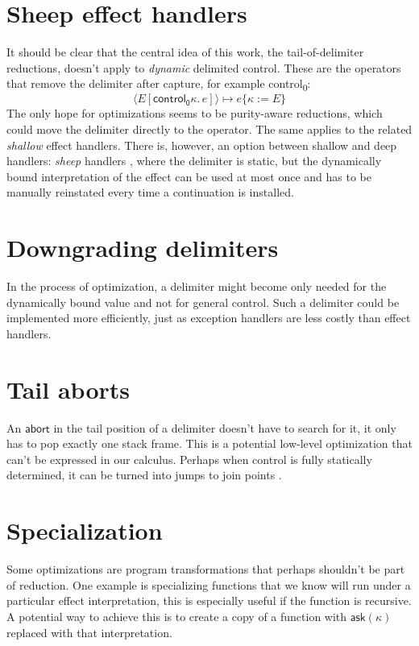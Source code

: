 \documentclass[a4paper, 11pt,titlepage, openright, twoside]{report}
\newcommand{\abort}{\textsf{abort}}
\newcommand{\Ask}{\textsf{ask}}
\newcommand{\subst}[2]{\{#1{:=}#2\}}
\newcommand{\A}{\mathcal{A}}
\newcommand{\+}{\enspace}
\begin{document}

\section{Sheep effect handlers}
It should be clear that the central idea of this work, the tail-of-delimiter reductions,
doesn't apply to \textit{dynamic} delimited control.
These are the operators that remove the delimiter after capture,
for example \textsf{control\textsubscript{0}}:
$$⟨E[\mathsf{control_0} κ.\,e]⟩ ↦ e\subst{κ}{E}$$
The only hope for optimizations seems to be purity-aware reductions,
which could move the delimiter directly to the operator. The same applies to the related \textit{shallow} effect handlers.
There is, however, an option between shallow and deep handlers: \textit{sheep} handlers \cite{sheep},
where the delimiter is static,
but the dynamically bound interpretation of the effect can be used at most once
and has to be manually reinstated every time a continuation is installed.

\section{Downgrading delimiters}
In the process of optimization,
a delimiter might become only needed for the dynamically bound value
and not for general control.
Such a delimiter could be implemented more efficiently,
just as exception handlers are less costly than effect handlers.

\section{Tail aborts}
An $\abort$ in the tail position of a delimiter
doesn't have to search for it,
it only has to pop exactly one stack frame.
This is a potential low-level optimization that can't be expressed in our calculus.
Perhaps when control is fully statically determined,
it can be turned into jumps to join points \cite{cwc}.

\section{Specialization}
Some optimizations are program transformations that perhaps shouldn't be part of reduction.
One example is specializing functions that we know will run under a particular effect interpretation,
this is especially useful if the function is recursive.
A potential way to achieve this is
to create a copy of a function with $\Ask(κ)$ replaced with that interpretation.
\end{document}
